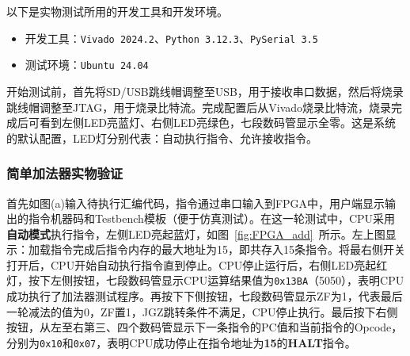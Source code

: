 \documentclass[lang=cn,a4paper,newtx]{elegantpaper}
\begin{document}
以下是实物测试所用的开发工具和开发环境。
\begin{itemize}
  \item 开发工具：\texttt{Vivado 2024.2}、\texttt{Python 3.12.3}、\texttt{PySerial 3.5}
  \item 测试环境：\texttt{Ubuntu 24.04}
\end{itemize}


开始测试前，首先将SD/USB跳线帽调整至USB，用于接收串口数据，然后将烧录跳线帽调整至JTAG，用于烧录比特流。完成配置后从Vivado烧录比特流，烧录完成后可看到左侧LED亮蓝灯、右侧LED亮绿色，七段数码管显示全零。这是系统的默认配置，LED灯分别代表：自动执行指令、允许接收指令。
\subsubsection{简单加法器实物验证}
首先如图(a)输入待执行汇编代码，指令通过串口输入到FPGA中，用户端显示输出的指令机器码和Testbench模板（便于仿真测试）。在这一轮测试中，CPU采用\textbf{自动模式}执行指令，左侧LED亮起蓝灯，如图~\ref{fig:FPGA_add}~所示。左上图显示：加载指令完成后指令内存的最大地址为15，即共存入15条指令。将最右侧开关打开后，CPU开始自动执行指令直到停止。CPU停止运行后，右侧LED亮起红灯，按下左侧按钮，七段数码管显示CPU运算结果值为\texttt{0x13BA}（5050），表明CPU成功执行了加法器测试程序。再按下下侧按钮，七段数码管显示ZF为1，代表最后一轮减法的值为0，ZF置1，JGZ跳转条件不满足，CPU停止执行。最后按下右侧按钮，从左至右第三、四个数码管显示下一条指令的PC值和当前指令的Opcode，分别为\texttt{0x10}和\texttt{0x07}，表明CPU成功停止在指令地址为\textbf{15}的\textbf{HALT}指令。
\end{document}

